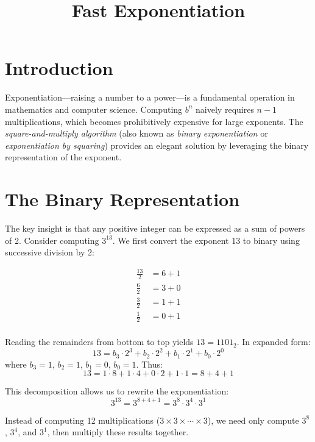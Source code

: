 \documentclass{article}
\begin{document}
	
	\title{Fast Exponentiation}
	\author{}
	\date{}
	\maketitle
	
	\tableofcontents
	
	\section{Introduction}
	
	Exponentiation---raising a number to a power---is a fundamental operation in mathematics and computer science. Computing $b^n$ naively requires $n-1$ multiplications, which becomes prohibitively expensive for large exponents. The \emph{square-and-multiply algorithm} (also known as \emph{binary exponentiation} or \emph{exponentiation by squaring}) provides an elegant solution by leveraging the binary representation of the exponent.
	
	\section{The Binary Representation}
	
	The key insight is that any positive integer can be expressed as a sum of powers of 2. Consider computing $3^{13}$. We first convert the exponent 13 to binary using successive division by 2:
	
    \begin{align*}
		\frac{13}{2} &= 6 + 1 \\
		\frac{6}{2} &= 3 + 0 \\
		\frac{3}{2} &= 1 + 1 \\
		\frac{1}{2} &= 0 + 1 \\
	\end{align*}
	
	Reading the remainders from bottom to top yields $13 = 1101_2$. In expanded form:
	\[
	13 = b_3 \cdot 2^3 + b_2 \cdot 2^2 + b_1 \cdot 2^1 + b_0 \cdot 2^0
	\]
	where $b_3 = 1$, $b_2 = 1$, $b_1 = 0$, $b_0 = 1$. Thus:
	\[
	13 = 1 \cdot 8 + 1 \cdot 4 + 0 \cdot 2 + 1 \cdot 1 = 8 + 4 + 1
	\]
	
	This decomposition allows us to rewrite the exponentiation:
	\[
	3^{13} = 3^{8+4+1} = 3^8 \cdot 3^4 \cdot 3^1
	\]
	
	Instead of computing 12 multiplications ($3 \times 3 \times \cdots \times 3$), we need only compute $3^8$, $3^4$, and $3^1$, then multiply these results together.
	
\end{document}

